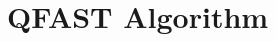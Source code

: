 \documentclass[aspectratio=1610]{beamer}
\begin{document}



\section{QFAST Algorithm}
\end{document}
